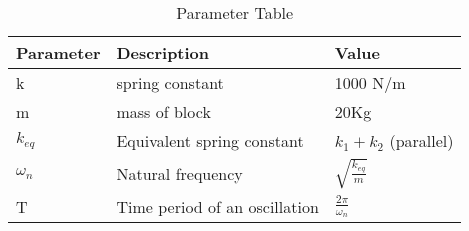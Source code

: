 \begin{table}[ht] 
\centering
\setlength{\extrarowheight}{8pt}
\begin{tabular}{|l|l|l|}
    \hline
    \textbf{Parameter} & \textbf{Description} & \textbf{Value} \\
    \hline
     k & spring constant & 1000 N/m \\
    \hline
     m & mass of block & 20Kg \\
    \hline
      $k_{eq}$& Equivalent spring constant& $k_1 + k_2$ (parallel)\\
    \hline
     $\omega_n$ & Natural frequency & $\sqrt{\frac{k_{eq}}{m}}$ \\
    \hline
    T & Time period of an oscillation & $\frac{2\pi}{\omega_n}$ \\
    \hline
  \end{tabular}
  \vspace{4mm}
 \caption{Parameter Table}
 \label{tab:table0}
\end{table}
